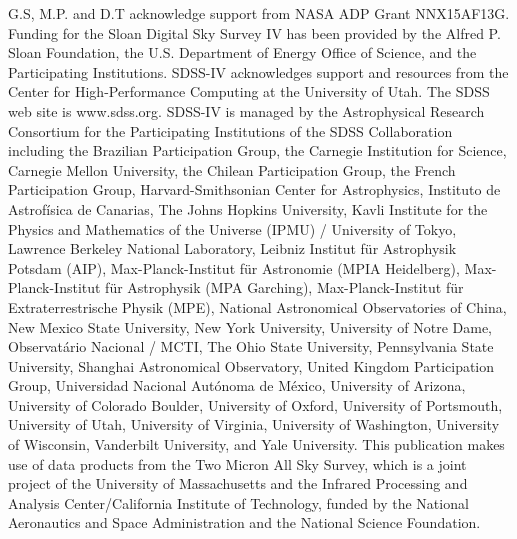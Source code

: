 \documentclass[manuscript]{aastex6}
\begin{document}
\acknowledgments

G.S, M.P. and D.T acknowledge support from NASA ADP Grant NNX15AF13G. 
Funding for the Sloan Digital Sky Survey IV has been provided by the Alfred P.
Sloan Foundation, the U.S. Department of Energy Office of Science, and the
Participating Institutions. SDSS-IV acknowledges support and resources from the
Center for High-Performance Computing at the University of Utah. The SDSS web
site is www.sdss.org. SDSS-IV is managed by the Astrophysical Research
Consortium for the Participating Institutions of the SDSS Collaboration
including the Brazilian Participation Group, the Carnegie Institution for
Science, Carnegie Mellon University, the Chilean Participation Group, the
French Participation Group, Harvard-Smithsonian Center for Astrophysics,
Instituto de Astrof\'isica de Canarias, The Johns Hopkins University, Kavli
Institute for the Physics and Mathematics of the Universe (IPMU) / University
of Tokyo, Lawrence Berkeley National Laboratory, Leibniz Institut f\"ur
Astrophysik Potsdam (AIP), Max-Planck-Institut f\"ur Astronomie (MPIA
Heidelberg), Max-Planck-Institut f\"ur Astrophysik (MPA Garching),
Max-Planck-Institut f\"ur Extraterrestrische Physik (MPE), National
Astronomical Observatories of China, New Mexico State University, New York
University, University of Notre Dame, Observat\'ario Nacional / MCTI, The Ohio
State University, Pennsylvania State University, Shanghai Astronomical
Observatory, United Kingdom Participation Group, Universidad Nacional
Aut\'onoma de M\'exico, University of Arizona, University of Colorado Boulder,
University of Oxford, University of Portsmouth, University of Utah, University
of Virginia, University of Washington, University of Wisconsin, Vanderbilt
University, and Yale University.  This publication makes use of data products
from the Two Micron All Sky Survey, which is a joint project of the University
of Massachusetts and the Infrared Processing and Analysis Center/California
Institute of Technology, funded by the National Aeronautics and Space
Administration and the National Science Foundation. 



\onecolumngrid




\end{document}
